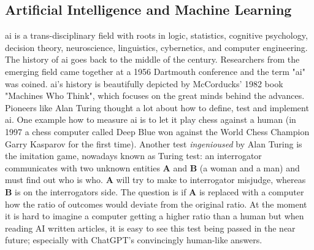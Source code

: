 \subsection{Artificial Intelligence and Machine Learning}
\Gls{ai} is a trans-disciplinary field with roots in logic, statistics, cognitive psychology, decision theory, neuroscience, linguistics, cybernetics, and computer engineering\cite{howard2019artificial}.
The history of \gls{ai} goes back to the middle of the  century. 
Researchers from the emerging field came together at a 1956 Dartmouth conference and the term "\gls{ai}" was coined\cite{McCarthy1955}. 
\Gls{ai}'s  history is beautifully depicted by McCorducks' 1982 book "Machines Who Think"\cite{McCorduck1982,Apter1982}, which focuses on the great minds behind the advances.
Pioneers like Alan Turing thought a lot about how to define, test and implement \gls{ai}\cite{howard2019artificial}. 
One example how to measure \gls{ai} is to let it play chess against a human\cite{Silver2017} 
(in 1997 a chess computer called Deep Blue won against the World Chess Champion Garry Kasparov for the first time\cite{Feng1999}).
Another test \textit{ingenioused} by Alan Turing is the imitation game\cite{turing1950imitation}, nowadays known as Turing test:
an interrogator communicates with two unknown entities \textbf{A} and \textbf{B} (a woman and a man) and must find out who is who. 
\textbf{A} will try to make to interrogator misjudge, whereas \textbf{B} is on the interrogators side.
The question is if \textbf{A} is replaced with a computer how the ratio of outcomes would deviate from the original ratio. 
%
At the moment it is hard to imagine a computer getting a higher ratio than a human
but when reading AI written articles\cite{gpt2020}, it is easy to see this test being passed in the near future; especially with ChatGPT's convincingly human-like answers\cite{dis2023chatgpt}.

